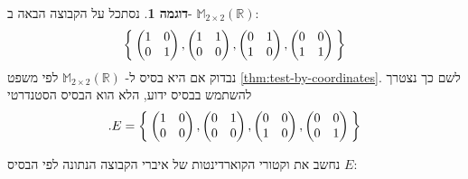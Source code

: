 \documentclass[12pt]{report}
\theoremstyle{plain}
\theoremstyle{definition}
\newtheorem{example}{דוגמה}[chapter]
\newcommand{\R}{\mathbb{R}}
\newcommand{\M}{\mathbb{M}}
\newcommand{\0}{\mathbf{0}}
\begin{document}
\begin{example}
נסתכל על הקבוצה הבאה ב-
$\M_{2\times 2}(\R)$:
$$
\Set{\begin{pmatrix}
1 & 0 \\
0 & 1
\end{pmatrix},\begin{pmatrix}
1 & 1 \\
0 & 0
\end{pmatrix},\begin{pmatrix}
0 & 1 \\
1 & 0
\end{pmatrix},\begin{pmatrix}
0 & 0 \\
1 & 1
\end{pmatrix}}
$$
נבדוק אם היא בסיס ל-
$\M_{2\times 2}(\R)$
לפי משפט
\ref{thm:test-by-coordinates}. 
לשם כך נצטרך להשתמש בבסיס ידוע, הלא הוא הבסיס הסטנדרטי
$$
.E=\Set{\begin{pmatrix}
1 & 0 \\
0 & 0
\end{pmatrix},\begin{pmatrix}
0 & 1 \\
0 & 0
\end{pmatrix},\begin{pmatrix}
0 & 0 \\
1 & 0
\end{pmatrix},\begin{pmatrix}
0 & 0 \\
0 & 1
\end{pmatrix}}
$$

נחשב את וקטורי הקוארדינטות של איברי הקבוצה הנתונה לפי הבסיס 
$E$:


\end{example}
\end{document}
